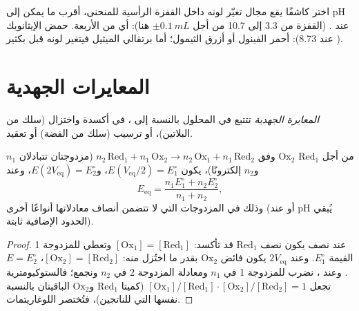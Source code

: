 \begin{method}\label{met:b1:titration-methods:choose-indicator}
اختر كاشفًا يقع مجال تغيّر لونه داخل القفزة الرأسية
للمنحنى، أقرب ما يمكن إلى pH عند .   (القفزة من 3.3 إلى 10.7 من أجل $\pm\qty{0.1}{mL}$ هنا): أي من
الأربعة. حمض الإيثانويك ( عند 8.73): أحمر الفينول أو أزرق الثيمول؛ أما برتقالي
الميثيل فيتغير لونه قبل  بكثير.
\end{method}

\section{المعايرات الجهدية}

\begin{definition}\label{def:b1:titration-methods:potentiometric}
\emph{المعايرة الجهدية}
تتتبع  في المحلول بالنسبة إلى
، في  أكسدة واختزال (سلك من البلاتين)، أو ترسيب (سلك من
الفضة) أو تعقيد.
\end{definition}

\begin{proposition}\label{prop:b1:titration-methods:potentiometric-points}
من أجل  $\mathrm{Red_1}$  $\mathrm{Ox_2}$ وفق
$n_2\,\mathrm{Red_1} + n_1\,\mathrm{Ox_2} \to n_2\,\mathrm{Ox_1} +
n_1\,\mathrm{Red_2}$ (مزدوجتان تتبادلان $n_1$ و$n_2$ إلكترونًا)، يكون $E(V_{\mathrm{eq}}/2) = E^\circ_1$، و$E(2V_{\mathrm{eq}}) =
E^\circ_2$، وعند 
\[
  E_{\mathrm{eq}} = \frac{n_1E^\circ_1 + n_2E^\circ_2}{n_1 + n_2},
\]
وذلك في المزدوجات التي لا تتضمن أنصاف معادلاتها أنواعًا أخرى (أو عند pH
يُبقي الحدود الإضافية ثابتة).
\end{proposition}

\begin{proof}
عند نصف  يكون نصف $\mathrm{Red_1}$ قد تأكسد:
$[\mathrm{Ox_1}] = [\mathrm{Red_1}]$ وتعطي  للمزدوجة 1
القيمة $E^\circ_1$. وعند $2V_{\mathrm{eq}}$ يكون فائض $\mathrm{Ox_2}$ بقدر
ما اختُزل منه: $[\mathrm{Ox_2}] = [\mathrm{Red_2}]$، $E = E^\circ_2$. وعند
، نضرب  للمزدوجة 1 في $n_1$ ومعادلة
المزدوجة 2 في $n_2$ ونجمع؛ فالستوكيومترية تجعل
$[\mathrm{Ox_1}]/[\mathrm{Red_1}] \cdot [\mathrm{Ox_2}]/[\mathrm{Red_2}] = 1$
(كميتا $\mathrm{Red_1}$ و$\mathrm{Ox_2}$ الباقيتان بالنسبة نفسها
التي للناتجين)، فتُختصر اللوغاريتمات.
\end{proof}

